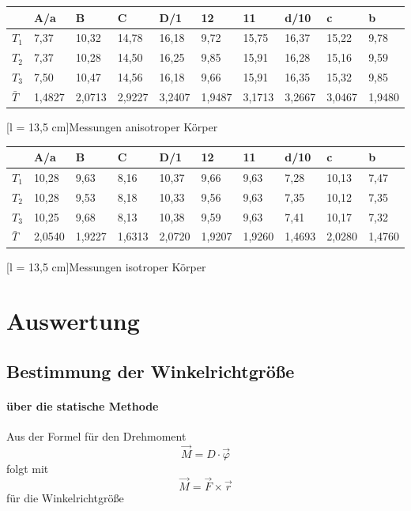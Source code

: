 \documentclass[12pt,a4paper,]{scrreprt}
\let\phi\varphi
\begin{document}
			\begin{tabular}{l|l|l|l|l|l|l|l|l|l}
   & 	   A/a & B      & C      & D/1    & 12     & 11     & d/10   & c      & b	 \\ \hline \hline
$T_1$   & 7,37   & 10,32  & 14,78  & 16,18  & 9,72   & 15,75  & 16,37  & 15,22  & 9,78   \\
$T_2$   & 7,37   & 10,28  & 14,50  & 16,25  & 9,85   & 15,91  & 16,28  & 15,16  & 9,59   \\
$T_3$   & 7,50   & 10,47  & 14,56  & 16,18  & 9,66   & 15,91  & 16,35  & 15,32  & 9,85   \\ \hline
$\bar{T}$   & 1,4827 & 2,0713 & 2,9227 & 3,2407 & 1,9487 & 3,1713 & 3,2667 & 3,0467 & 1,9480 
\end{tabular}
[l = 13,5 cm]{Messungen anisotroper Körper}
\ \\
			\begin{tabular}{l|l|l|l|l|l|l|l|l|l}
				 & A/a    & B      & C      & D/1    & 12     & 11     & d/10   & c      & b      \\ \hline \hline 
				$T_1$   & 10,28  & 9,63   & 8,16   & 10,37  & 9,66   & 9,63   & 7,28   & 10,13  & 7,47   \\ 
				$T_2 $  & 10,28  & 9,53   & 8,18   & 10,33  & 9,56   & 9,63   & 7,35   & 10,12  & 7,35   \\
				$T_3 $  & 10,25  & 9,68   & 8,13   & 10,38  & 9,59   & 9,63   & 7,41   & 10,17  & 7,32   \\ \hline 
				$\bar{T}$   & 2,0540 & 1,9227 & 1,6313 & 2,0720 & 1,9207 & 1,9260 & 1,4693 & 2,0280 & 1,4760
			\end{tabular}
			[l = 13,5 cm]{Messungen isotroper Körper}

        \pagebreak
        
        \chapter{Auswertung}
			\section{Bestimmung der Winkelrichtgröße}
				\subsubsection{über die statische Methode}
					Aus der Formel für den Drehmoment 
					\begin{equation}
						\vec{M} = D \cdot \vec{\phi}
					\end{equation}
					folgt mit 
					\begin{equation}
						\vec{M} = \vec{F} \times \vec{r}
					\end{equation}
					für die Winkelrichtgröße
            
\end{document}
